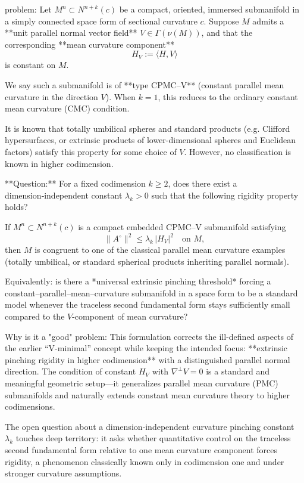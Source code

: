 problem:  
Let \(M^n \subset N^{n+k}(c)\) be a compact, oriented, immersed submanifold in a simply connected space form of sectional curvature \(c\).  
Suppose \(M\) admits a **unit parallel normal vector field** \(V\in \Gamma(\nu(M))\), and that the corresponding **mean curvature component**
\[
H_V := \langle H, V \rangle 
\]
is constant on \(M\).  

We say such a submanifold is of **type CPMC–V** (constant parallel mean curvature in the direction \(V\)). When \(k=1\), this reduces to the ordinary constant mean curvature (CMC) condition.

It is known that totally umbilical spheres and standard products (e.g. Clifford hypersurfaces, or extrinsic products of lower-dimensional spheres and Euclidean factors) satisfy this property for some choice of \(V\). However, no classification is known in higher codimension.

**Question:**  
For a fixed codimension \(k \ge 2\), does there exist a dimension‑independent constant \(\lambda_k > 0\) such that the following rigidity property holds?

If \(M^n \subset N^{n+k}(c)\) is a compact embedded CPMC–V submanifold satisfying
\[
\|A^\circ\|^2 \le \lambda_k\, |H_V|^2  \quad \text{on } M,
\]
then \(M\) is congruent to one of the classical parallel mean curvature examples (totally umbilical, or standard spherical products inheriting parallel normals).  

Equivalently: is there a *universal extrinsic pinching threshold* forcing a constant–parallel–mean–curvature submanifold in a space form to be a standard model whenever the traceless second fundamental form stays sufficiently small compared to the \(V\)-component of mean curvature?

Why is it a "good" problem:  
This formulation corrects the ill-defined aspects of the earlier “V-minimal” concept while keeping the intended focus: **extrinsic pinching rigidity in higher codimension** with a distinguished parallel normal direction.  
The condition of constant \(H_V\) with \(\nabla^\perp V = 0\) is a standard and meaningful geometric setup—it generalizes parallel mean curvature (PMC) submanifolds and naturally extends constant mean curvature theory to higher codimensions.  

The open question about a dimension‑independent curvature pinching constant \(\lambda_k\) touches deep territory: it asks whether quantitative control on the traceless second fundamental form relative to one mean curvature component forces rigidity, a phenomenon classically known only in codimension one and under stronger curvature assumptions.  


